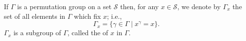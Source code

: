 If $\Gamma$ is a permutation group on a set $\mathcal{S}$ then, for any $x \in \mathcal{S}$, we denote by $\Gamma_x$ the set of all elements in $\Gamma$ which fix $x$; i.e.,
$$\Gamma_x = \{\gamma \in \Gamma \mid x^\gamma = x\}.$$
$\Gamma_x$ is a subgroup of $\Gamma$, called the  of $x$ in $\Gamma$.